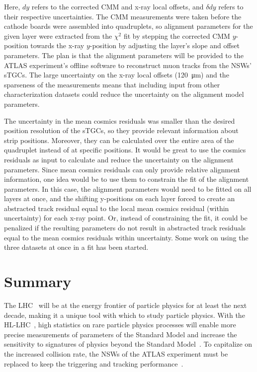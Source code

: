 Here, $dy$ refers to the corrected CMM and x-ray local offsets, and $\delta dy$ refers to their respective uncertainties. The CMM measurements were taken before the cathode boards were assembled into quadruplets, so alignment parameters for the given layer were extracted from the $\chi^2$ fit by stepping the corrected CMM $y$-position towards the x-ray $y$-position by adjusting the layer's slope and offset parameters. The plan is that the alignment parameters will be provided to the ATLAS experiment's offline software to reconstruct muon tracks from the NSWs' sTGCs. The large uncertainty on the x-ray local offsets (\SI{120}{\micro\meter}) and the sparseness of the measurements means that including input from other characterization datasets could reduce the uncertainty on the alignment model parameters. 

The uncertainty in the mean cosmics residuals was smaller than the desired position resolution of the sTGCs, so they provide relevant information about strip positions. Moreover, they can be calculated over the entire area of the quadruplet instead of at specific positions. It would be great to use the cosmics residuals as input to calculate and reduce the uncertainty on the alignment parameters. Since mean cosmics residuals can only provide relative alignment information, one idea would be to use them to constrain the fit of the alignment parameters. In this case, the alignment parameters would need to be fitted on all layers at once, and the shifting y-positions on each layer forced to create an abstracted track residual equal to the local mean cosmics residual (within uncertainty) for each x-ray point. Or, instead of constraining the fit, it could be penalized if the resulting parameters do not result in abstracted track residuals equal to the mean cosmics residuals within uncertainty. Some work on using the three datasets at once in a fit has been started.

\section{Summary}
\label{sec:summary}

The LHC~\cite{evans_lhc_2008} will be at the energy frontier of particle physics for at least the next decade, making it a unique tool with which to study particle physics. With the HL-LHC~\cite{hl_lhc_tdr}, high statistics on rare particle physics processes will enable more precise measurements of parameters of the Standard Model and increase the sensitivity to signatures of physics beyond the Standard Model~\cite{dainese_physics_2018}. To capitalize on the increased collision rate, the NSWs of the ATLAS experiment must be replaced to keep the triggering and tracking performance~\cite{nsw_tdr}. 


